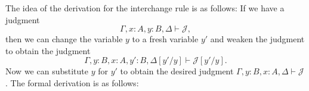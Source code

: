 The idea of the derivation for the interchange rule is as follows: If we have a judgment
\begin{equation*}
  \Gamma,x:A,y:B,\Delta\vdash\mathcal{J},
\end{equation*}
then we can change the variable $y$ to a fresh variable $y'$ and weaken the judgment to obtain the judgment
\begin{equation*}
  \Gamma,y:B,x:A,y':B,\Delta[y'/y]\vdash\mathcal{J}[y'/y].
\end{equation*}
Now we can substitute $y$ for $y'$ to obtain the desired judgment $\Gamma,y:B,x:A,\Delta\vdash\mathcal{J}$. The formal derivation is as follows:
\begin{small}
\begin{prooftree}
\end{prooftree}
\end{small}


\begin{comment}
For $A\in T_n$ we define $T_{n+k+1}(A):= \{B\in T_{n+k}\mid \mathrm{ft}^{k+1}(B)=A\}$. Similarly we define $\tilde{T}_{n+k+1}(A):=\{b\in\tilde{T}_{n+k+1}\mid\mathrm{ft}^{k+1}(\partial(b))=A\}$. For any closed type $A$ we maintain the convention that $T_{k}(\mathrm{ft}(A)):= T_k$.
\begin{enumerate}
\item For all $A\in T_n$, and all $k\in\N$, \define{weakening} operations
\begin{align*}
W_A & : T_{n+k}(\mathrm{ft}(A)) \to T_{n+k+1}(A) \\
\tilde{W}_A & : \tilde{T}_{n+k}(\mathrm{ft}(A))\to \tilde{T}_{n+k+1}(A)
\end{align*}
subject to the conditions $\mathrm{ft}(W_A(B))=W_A(\mathrm{ft}(B))$ if $B\in T_{n+k}$ with $k\geq 1$, and $\partial(\tilde{W}_A(b))=W_A(\partial(b))$.
\item For all $A\in T_n$ a term $\delta_A\in \tilde{T}_{n+1}$ satisfying $\partial(\delta_A)=W_A(A)$. 
\item For all $a\in \tilde{T}_n$ satisfying $\partial(a)=A$, and all $k\in\N$, \define{substitution} operations
\begin{align*}
S_a & : \{B\in T_{n+k+1}\mid \mathrm{ft}^{k+1}(B)= A\}\to T_k \\
\tilde{S}_a & : \{b\in \tilde{T}_{n+k+1}\mid \mathrm{ft}^{k+1}(\partial(b))=A\}\to \tilde{T}_{n+k}
\end{align*}
subject to the conditions $\mathrm{ft}(S_a(B))=\mathrm{ft}(A)$ if $B\in T_{n+1}$, $\mathrm{ft}(S_a(B))=S_a(\mathrm{ft}(B))$ if $B\in T_{n+k+1}$ with $k\geq 1$, and $\partial(\tilde{S}_a(b))=S_a(\partial(b))$.
\end{enumerate}
\end{comment}

